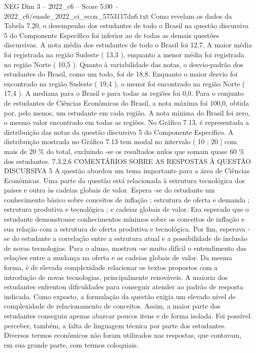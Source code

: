 \begin{textsample}{NEG Dim 3 – 2022\_c6 – Score 5.00 – 2022\_c6/enade\_2022\_ci\_econ\_5753117da6.txt}
Como revelam os dados da Tabela 7.20, o desempenho dos estudantes de todo o Brasil na questão discursiva 5 do Componente Específico foi inferior ao de todas as demais questões discursivas.
A nota média dos estudantes de todo o Brasil foi 12,7.
A maior média foi registrada na região Sudeste ( 13,3 ), enquanto a menor média foi registrada na região Norte ( 10,5 ).
Quanto à variabilidade das notas, o desvio-padrão dos estudantes do Brasil, como um todo, foi de 18,8.
Enquanto o maior desvio foi encontrado na região Sudeste ( 19,4 ), o menor foi encontrado na região Norte ( 17,4 ).
A mediana para o Brasil e para todas as regiões foi 0,0.
Para o conjunto de estudantes de Ciências Econômicas do Brasil, a nota máxima foi 100,0, obtida por, pelo menos, um estudante em cada região.
A nota mínima do Brasil foi zero, o mesmo valor encontrado em todas as regiões.
No Gráfico 7.13, é representada a distribuição das notas da questão discursiva 5 do Componente Específico.
A distribuição mostrada no Gráfico 7.13 tem modal no intervalo ( 10 ; 20 ] com mais de 20 \% do total, excluindo -se os resultados nulos que somam quase 60 \% dos estudantes. 7.3.2.6 COMENTÁRIOS SOBRE AS RESPOSTAS À QUESTÃO DISCURSIVA 5 A questão abordou um tema importante para a área de Ciências Econômicas.
Uma parte da questão está relacionada à estrutura tecnológica dos países e outra às cadeias globais de valor.
Espera -se do estudante um conhecimento básico sobre conceitos de inflação ; estrutura de oferta e demanda ; estrutura produtiva e tecnológica ; e cadeias globais de valor.
Era esperado que o estudante demonstrasse conhecimentos mínimos sobre os conceitos de inflação e sua relação com a estrutura de oferta produtiva e tecnológica.
Por fim, esperava -se do estudante a correlação entre a estrutura atual e a possibilidade de inclusão de novas tecnologias.
Para o aluno, mostrou -se muito difícil o entendimento das relações entre a mudança na oferta e as cadeias globais de valor.
Da mesma forma, é de elevada complexidade relacionar os textos propostos com a introdução de novas tecnologias, principalmente renováveis.
A maioria dos estudantes enfrentou dificuldades para conseguir atender ao padrão de resposta indicado.
Como exposto, a formulação da questão exigia um elevado nível de complexidade de relacionamento de conceitos.
Assim, a maior parte dos estudantes conseguiu apenas abarcar poucos itens e de forma isolada.
Foi possível perceber, também, a falta de linguagem técnica por parte dos estudantes.
Diversos termos econômicos não foram utilizados nas respostas, que contavam, em sua grande parte, com termos coloquiais.

\end{textsample}
